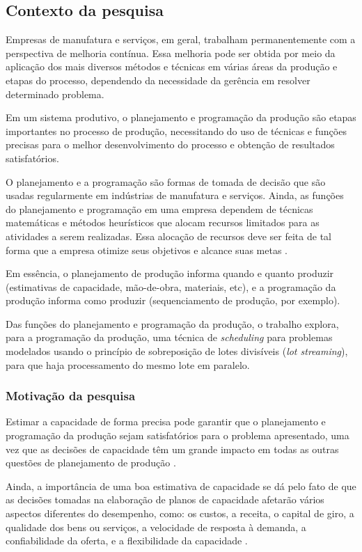 \subsection{Contexto da pesquisa} \label{subsec:contexto}
    Empresas de manufatura e serviços, em geral, trabalham permanentemente com a perspectiva de melhoria contínua. Essa melhoria pode ser obtida por meio da aplicação dos mais diversos métodos e técnicas em várias áreas da produção e etapas do processo, dependendo da necessidade da gerência em resolver determinado problema.
    
    Em um sistema produtivo, o planejamento e programação da produção são etapas importantes no processo de produção, necessitando do uso de técnicas e funções precisas para o melhor desenvolvimento do processo e obtenção de resultados satisfatórios.
    
    O planejamento e a programação são formas de tomada de decisão que são usadas regularmente em indústrias de manufatura e serviços. Ainda, as funções do planejamento e programação em uma empresa dependem de técnicas matemáticas e métodos heurísticos que alocam recursos limitados para as atividades a serem realizadas. Essa alocação de recursos deve ser feita de tal forma que a empresa otimize seus objetivos e alcance suas metas \cite{Pinedo2009}.
    
    Em essência, o planejamento de produção informa quando e quanto produzir (estimativas de capacidade, mão-de-obra, materiais, etc), e a programação da produção informa como produzir (sequenciamento de produção, por exemplo).
    
    Das funções do planejamento e programação da produção, o trabalho explora, para a programação da produção, uma técnica de \textit{scheduling} para problemas modelados usando o princípio de sobreposição de lotes divisíveis (\textit{lot streaming}), para que haja processamento do mesmo lote em paralelo.
    
\subsubsection{Motivação da pesquisa} \label{subsubsec:motivacao}
    Estimar a capacidade de forma precisa pode garantir que o planejamento e programação da produção sejam satisfatórios para o problema apresentado, uma vez que as decisões de capacidade têm um grande impacto em todas as outras questões de planejamento de produção \cite{Hopp2001}. 
    
    Ainda, a importância de uma boa estimativa de capacidade se dá pelo fato de que as decisões tomadas na elaboração de planos de capacidade afetarão vários aspectos diferentes do desempenho, como: os custos, a receita, o capital de giro, a qualidade dos bens ou serviços, a velocidade de resposta à demanda, a confiabilidade da oferta, e a flexibilidade da capacidade \cite{slack2013operations}. 
    

